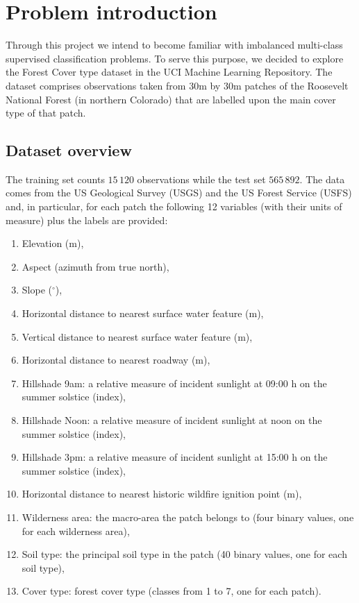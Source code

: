 \chapter{Problem introduction}
Through this project we intend to become familiar with imbalanced multi-class supervised classification problems. To serve this purpose, we decided to explore the Forest Cover type dataset in the UCI Machine Learning Repository. The dataset comprises observations taken from 30m by 30m patches of the Roosevelt National Forest (in northern Colorado) that are labelled upon the main cover type of that patch.

\section{Dataset overview}
The training set counts $15\,120$ observations while the test set $565\,892$. The data comes from the US Geological Survey
(USGS) and the US Forest Service (USFS) and, in particular, for each patch the following 12 variables (with their units of measure) plus the labels are provided:
\begin{enumerate}
	\item Elevation (m),
	\item Aspect (azimuth from true north),
	\item Slope ($^{\circ}$),
	\item Horizontal distance to nearest surface water feature (m),
	\item Vertical distance to nearest surface water feature (m),
	\item Horizontal distance to nearest roadway (m),
	\item Hillshade 9am: a relative measure of incident sunlight at 09:00 h on the summer solstice (index),
	\item Hillshade Noon: a relative measure of incident sunlight at noon on the summer solstice (index),
	\item Hillshade 3pm: a relative measure of incident sunlight at 15:00 h on the summer solstice (index),
	\item Horizontal distance to nearest historic wildfire ignition point (m),
	\item Wilderness area: the macro-area the patch belongs to (four binary values, one for each wilderness area),
	\item Soil type: the principal soil type in the patch (40 binary values, one for each soil type),
	\item Cover type: forest cover type (classes from 1 to 7, one for each patch).
\end{enumerate}
